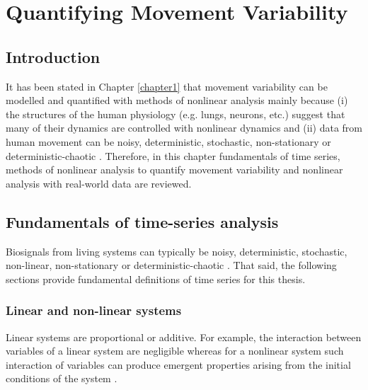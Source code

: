 \chapter{Quantifying Movement Variability} \label{chapter2}

\section{Introduction}
It has been stated in Chapter \ref{chapter1} that movement variability can 
be modelled
and quantified with methods of nonlinear analysis mainly 
because
(i) the structures of the human physiology 
(e.g. lungs, neurons, etc.) suggest that many of their dynamics 
are controlled with nonlinear dynamics \citep{goldberger1990} 
and (ii) data from human movement can be noisy, deterministic, 
stochastic, non-stationary or deterministic-chaotic 
\citep{hatze1986, preatoni2010, preatoni2013, 
stergiou2006, newell1998, stergiou2011, caballero2014}.
Therefore, in this chapter fundamentals of time series, 
methods of nonlinear analysis to quantify movement variability 
and nonlinear analysis with real-world data are reviewed.

\section{Fundamentals of time-series analysis}
Biosignals from living systems can typically be 
noisy, deterministic, stochastic, non-linear, 
non-stationary or deterministic-chaotic \citep{klonowski2007, caballero2014, 
wijnants2009, gomezgarcia2014, stergiou2006, harbourne2009, stergiou2011,
hatze1986, newell1998}. That said, the following sections provide 
fundamental definitions of time series for this thesis.

\subsection{Linear and non-linear systems}
Linear systems are proportional or additive. For example, the interaction 
between variables of a linear system are negligible whereas for a nonlinear 
system such interaction of variables can produce emergent properties 
arising from the initial conditions of the system \citep{klonowski2007}.

